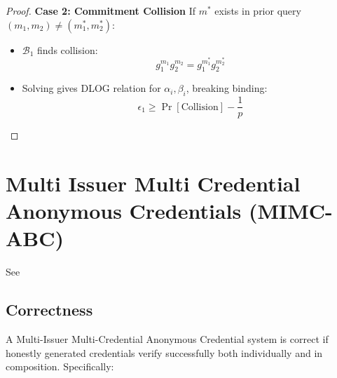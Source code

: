 \begin{proof}
\noindent \textbf{Case 2: Commitment Collision}
If $m^*$ exists in prior query $(m_1, m_2) \neq (m_1^*, m_2^*)$:
\begin{itemize}
    \item $\mathcal{B}_1$ finds collision:
    \[
    g_1^{m_1}g_2^{m_2} = g_1^{m_1^*}g_2^{m_2^*}
    \]
    \item Solving gives DLOG relation for $\alpha_i, \beta_i$, breaking binding:
    \[
    \epsilon_1 \geq \Pr[\text{Collision}] - \frac{1}{p}
    \]
\end{itemize}


\end{proof}








% 
% 



































% 
% 




\cleardoublepage

\section{Multi Issuer Multi Credential Anonymous Credentials (MIMC-ABC)}\label{sec:mimc}
See 

\subsection{Correctness}
A Multi-Issuer Multi-Credential Anonymous Credential system is correct if honestly generated credentials verify successfully both individually and in composition. Specifically:

